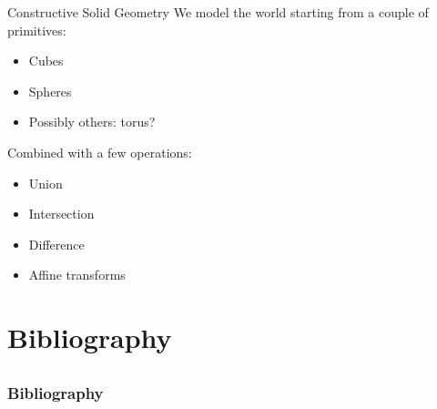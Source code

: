 \documentclass[utf8x]{beamer}
\begin{document}
\begin{frame}{Constructive Solid Geometry}
We model the world starting from a couple of primitives:
\begin{itemize}
\item Cubes
\item Spheres
\item Possibly others: torus?
\end{itemize}
Combined with a few operations:
\begin{itemize}
\item Union
\item Intersection
\item Difference
\item Affine transforms
\end{itemize}
\end{frame}

\section{Bibliography}
\subsection{}
\begin{frame}[allowframebreaks]
\frametitle{Bibliography}
\begin{center}


\end{center}
\end{frame}
\end{document}
